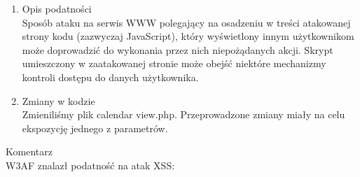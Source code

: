\begin{enumerate}
\item Opis podatności\\
 Sposób ataku na serwis WWW polegający na osadzeniu w treści atakowanej strony kodu (zazwyczaj JavaScript), który wyświetlony innym użytkownikom może doprowadzić do wykonania przez nich niepożądanych akcji. Skrypt umieszczony w zaatakowanej stronie może obejść niektóre mechanizmy kontroli dostępu do danych użytkownika.

\item Zmiany w kodzie\\
Zmieniliśmy plik calendar view.php. Przeprowadzone zmiany miały na celu ekspozycję jednego z parametrów.

\noindent
\begin{minipage}{\linewidth}
\label{erd}
\end{minipage}
\end{enumerate}

\item Komentarz\\
W3AF znalazł podatność na atak XSS:

